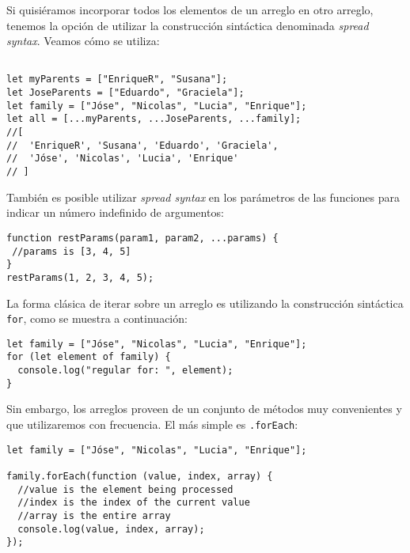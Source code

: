 \documentclass[a4paper, oneside, titlepage, 12pt]{paper}
\begin{document}
Si quisiéramos incorporar todos los elementos de un arreglo en otro arreglo, tenemos la opción de utilizar la construcción sintáctica denominada \textit{spread syntax}. Veamos cómo se utiliza:

\begin{verbatim}

let myParents = ["EnriqueR", "Susana"];
let JoseParents = ["Eduardo", "Graciela"];
let family = ["Jóse", "Nicolas", "Lucia", "Enrique"];
let all = [...myParents, ...JoseParents, ...family];
//[
//  'EnriqueR', 'Susana', 'Eduardo', 'Graciela', 
//  'Jóse', 'Nicolas', 'Lucia', 'Enrique'
// ]
\end{verbatim}

También es posible utilizar \textit{spread syntax} en los parámetros de las funciones para indicar un número indefinido de argumentos:

\begin{verbatim}
function restParams(param1, param2, ...params) {
 //params is [3, 4, 5]	
}
restParams(1, 2, 3, 4, 5);
\end{verbatim}

La forma clásica de iterar sobre un arreglo es utilizando la construcción sintáctica \texttt{for}, como se muestra a continuación: 

\begin{verbatim}
let family = ["Jóse", "Nicolas", "Lucia", "Enrique"];
for (let element of family) {
  console.log("regular for: ", element);
}
\end{verbatim}
               
Sin embargo, los arreglos proveen de un conjunto de métodos muy convenientes y que utilizaremos con frecuencia. El más simple es \texttt{.forEach}:              
\begin{verbatim}
let family = ["Jóse", "Nicolas", "Lucia", "Enrique"];

family.forEach(function (value, index, array) {
  //value is the element being processed
  //index is the index of the current value
  //array is the entire array
  console.log(value, index, array);
});
\end{verbatim}
\end{document}
